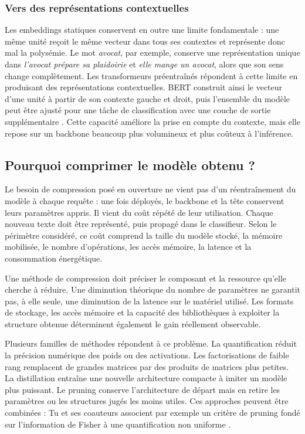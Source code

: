 \subsubsection{Vers des représentations contextuelles}

Les embeddings statiques conservent en outre une limite fondamentale : une même
unité reçoit le même vecteur dans tous ses contextes et représente donc mal la
polysémie. Le mot \emph{avocat}, par exemple, conserve une représentation unique
dans \emph{l'avocat prépare sa plaidoirie} et \emph{elle mange un avocat}, alors
que son sens change complètement. Les transformeurs préentraînés répondent à
cette limite en produisant des représentations contextuelles. BERT construit
ainsi le vecteur d'une unité à partir de son contexte gauche et droit, puis
l'ensemble du modèle peut être ajusté pour une tâche de classification avec une
couche de sortie supplémentaire \cite{devlin2019bert}. Cette capacité améliore
la prise en compte du contexte, mais elle repose sur un backbone beaucoup plus
volumineux et plus coûteux à l'inférence.

\subsection{Pourquoi comprimer le modèle obtenu ?}
\label{ssec:etat_art_compression}

Le besoin de compression posé en ouverture ne vient pas d'un réentraînement du
modèle à chaque requête : une fois déployés, le backbone et la tête conservent
leurs paramètres appris. Il vient du coût répété de leur utilisation. Chaque
nouveau texte doit être représenté, puis propagé dans le classifieur. Selon le
périmètre considéré, ce coût comprend la taille du modèle stocké, la mémoire
mobilisée, le nombre d'opérations, les accès mémoire, la latence et la
consommation énergétique.

Une méthode de compression doit préciser le composant et la ressource qu'elle
cherche à réduire. Une diminution théorique du nombre de paramètres ne garantit
pas, à elle seule, une diminution de la latence sur le matériel utilisé. Les
formats de stockage, les accès mémoire et la capacité des bibliothèques à
exploiter la structure obtenue déterminent également le gain réellement
observable.

Plusieurs familles de méthodes répondent à ce problème. La quantification réduit
la précision numérique des poids ou des activations. Les factorisations de
faible rang remplacent de grandes matrices par des produits de matrices plus
petites. La distillation entraîne une nouvelle architecture compacte à imiter
un modèle plus puissant. Le pruning conserve l'architecture de départ mais en
retire les paramètres ou les structures jugés les moins utiles. Ces approches
peuvent être combinées : Tu et ses coauteurs associent par exemple un critère de
pruning fondé sur l'information de Fisher à une quantification non uniforme
\cite{tu2016fisher}.

